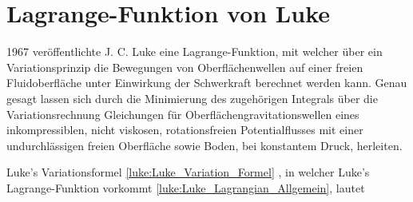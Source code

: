 %
%
%
%

\section{Lagrange-Funktion von Luke\label{luke:section:Luke_Lagrangian}}

1967 veröffentlichte J. C. Luke \cite{luke:Luke1967} eine Lagrange-Funktion, mit welcher über ein Variationsprinzip die Bewegungen von Oberflächenwellen auf einer freien Fluidoberfläche unter Einwirkung der Schwerkraft berechnet werden kann.
Genau gesagt lassen sich durch die Minimierung des zugehörigen Integrals über die Variationsrechnung Gleichungen für Oberflächengravitationswellen eines inkompressiblen, nicht viskosen, rotationsfreien Potentialflusses mit einer undurchlässigen freien Oberfläche sowie Boden, bei konstantem Druck, herleiten.

Luke’s Variationsformel \eqref{luke:Luke_Variation_Formel} , in welcher Luke’s Lagrange-Funktion vorkommt \eqref{luke:Luke_Lagrangian_Allgemein}, lautet


